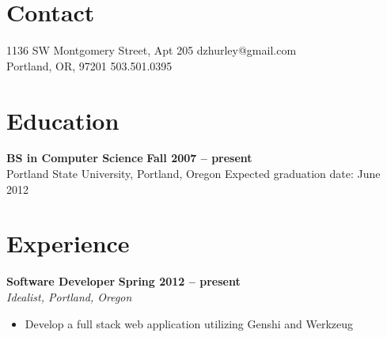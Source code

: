 \documentclass[margin,line]{resume}
\begin{document}
\begin{resume}

    \section{\mysidestyle Contact}

    1136 SW Montgomery Street, Apt 205  \hfill dzhurley@gmail.com  \vspace{0mm}\\\vspace{0mm}%
    Portland, OR, 97201                 \hfill 503.501.0395        \vspace{0mm}%

    \section{\mysidestyle Education}

    \textbf{BS in Computer Science}             \hfill \textbf{ Fall 2007 -- present}      \vspace{2mm}\\\vspace{1mm}%
    Portland State University, Portland, Oregon \hfill Expected graduation date: June 2012 \vspace{-3mm}\\\vspace{-1mm}%

    \section{\mysidestyle Experience}

    \textbf{Software Developer} \hfill \textbf{Spring 2012 -- present} \vspace{2mm}\\\vspace{1mm}%
    \textsl{Idealist, Portland, Oregon}
    \begin{itemize}
        \item Develop a full stack web application utilizing Genshi and Werkzeug
    \end{itemize}


\end{resume}
\end{document}

